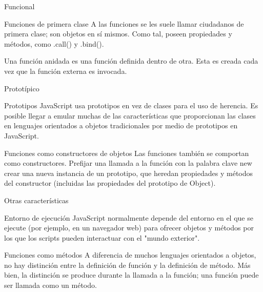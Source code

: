 \begin{frame}[c]{Funcional}

  \begin{block}{Funciones de primera clase}
    A las funciones se les suele llamar ciudadanos de primera clase;
    son objetos en sí mismos. Como tal, poseen propiedades y métodos, 
    como .call() y .bind().

    \vspace{\baselineskip}
    Una función anidada es una función definida dentro de otra.
    Esta es creada cada vez que la función externa es invocada.
  \end{block}

\end{frame}

\begin{frame}[c]{Prototípico}

  \begin{block}{Prototipos}
    JavaScript usa prototipos en vez de clases para el uso de
    herencia. Es posible llegar a emular muchas de las
    características que proporcionan las clases en lenguajes orientados a
    objetos tradicionales por medio de prototipos en JavaScript.
  \end{block}

  \begin{block}{Funciones como constructores de objetos}
    Las funciones también se comportan como constructores. Prefijar una
    llamada a la función con la palabra clave new crear una nueva instancia
    de un prototipo, que heredan propiedades y métodos del constructor
    (incluidas las propiedades del prototipo de Object).
  \end{block}

\end{frame}

\begin{frame}[c]{Otras características}

  \begin{block}{Entorno de ejecución}
    JavaScript normalmente depende del entorno en el que se ejecute (por
    ejemplo, en un navegador web) para ofrecer objetos y métodos por los que
    los scripts pueden interactuar con el "mundo exterior".
  \end{block}

  \begin{block}{Funciones como métodos}
    A diferencia de muchos lenguajes orientados a objetos, no hay distinción
    entre la definición de función y la definición de método. Más bien, la
    distinción se produce durante la llamada a la función; una función puede
    ser llamada como un método.
  \end{block}

\end{frame}


